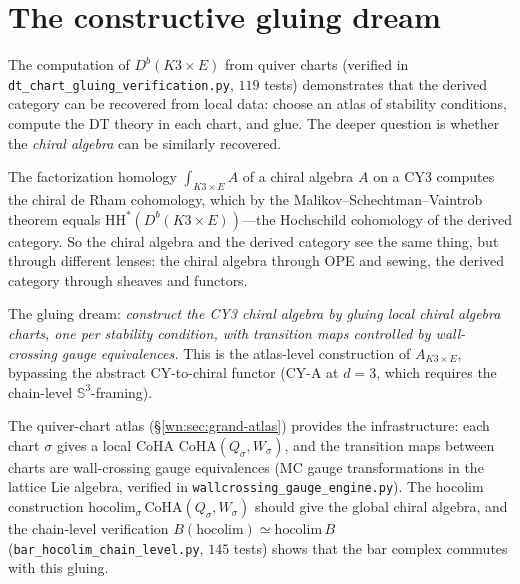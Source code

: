 \documentclass[11pt]{article}
\newcommand{\bS}{\mathbb{S}}
\newcommand{\HH}{\mathrm{HH}}
\newcommand{\CoHA}{\mathrm{CoHA}}
\begin{document}
\section{The constructive gluing dream}
\label{sec:motivic-gluing}

The computation of $D^b(K3 \times E)$ from quiver charts (verified in \texttt{dt\_chart\_gluing\_verification.py}, $119$ tests) demonstrates that the derived category can be recovered from local data: choose an atlas of stability conditions, compute the DT theory in each chart, and glue. The deeper question is whether the \emph{chiral algebra} can be similarly recovered.

The factorization homology $\int_{K3 \times E} A$ of a chiral algebra $A$ on a CY3 computes the chiral de Rham cohomology, which by the Malikov--Schechtman--Vaintrob theorem equals $\HH^*(D^b(K3 \times E))$---the Hochschild cohomology of the derived category. So the chiral algebra and the derived category see the same thing, but through different lenses: the chiral algebra through OPE and sewing, the derived category through sheaves and functors.

The gluing dream: \emph{construct the CY3 chiral algebra by gluing local chiral algebra charts, one per stability condition, with transition maps controlled by wall-crossing gauge equivalences.} This is the atlas-level construction of $A_{K3 \times E}$, bypassing the abstract CY-to-chiral functor (CY-A at $d = 3$, which requires the chain-level $\bS^3$-framing).

The quiver-chart atlas (\S\ref{wn:sec:grand-atlas}) provides the infrastructure: each chart $\sigma$ gives a local CoHA $\CoHA(Q_\sigma, W_\sigma)$, and the transition maps between charts are wall-crossing gauge equivalences (MC gauge transformations in the lattice Lie algebra, verified in \texttt{wallcrossing\_gauge\_engine.py}). The hocolim construction $\mathrm{hocolim}_\sigma\, \CoHA(Q_\sigma, W_\sigma)$ should give the global chiral algebra, and the chain-level verification $B(\mathrm{hocolim}) \simeq \mathrm{hocolim}\, B$ (\texttt{bar\_hocolim\_chain\_level.py}, $145$ tests) shows that the bar complex commutes with this gluing.

\end{document}
